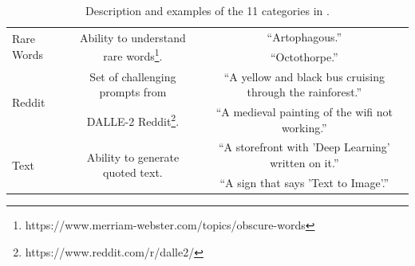 \begin{table}[t]
{{\begin{tabular}{lcc}
    \midrule
    \multirow{2}{*}{Rare Words} & \multirow{2}{*}{Ability to understand rare words\footnote{https://www.merriam-webster.com/topics/obscure-words}.} & ``Artophagous.'' \\
    & & ``Octothorpe.'' \\
    \midrule
    \multirow{2}{*}{Reddit} & Set of challenging prompts from & ``A yellow and black bus cruising through the rainforest.'' \\
    & DALLE-2 Reddit\footnote{https://www.reddit.com/r/dalle2/}.& ``A medieval painting of the wifi not working.'' \\
    \midrule
    \multirow{2}{*}{Text} & \multirow{2}{*}{Ability to generate quoted text.} & ``A storefront with 'Deep Learning' written on it.'' \\
    & & ``A sign that says 'Text to Image'.'' \\
    \bottomrule
    \end{tabular}
    }
    }
    \vspace*{0.3cm}
    \caption{Description and examples of the 11 categories in \benchmarkname.}
    \label{tab:drawbench-categories}
\end{table}




